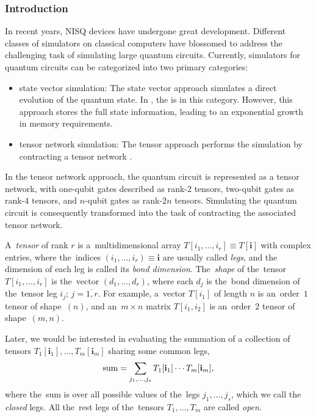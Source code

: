 \subsubsection{Introduction}
In recent years, NISQ devices have undergone great development. Different classes of simulators on classical computers have blossomed to address the challenging task of simulating large quantum circuits. Currently, simulators for quantum circuits can be categorized into two primary categories:
\begin{itemize}
    \item state vector simulation: The state vector approach simulates a direct evolution of the quantum state. In \MindQuantum, the  is in this category. However, this approach stores the full state information, leading to an exponential growth in memory requirements.
    \item tensor network simulation: The tensor approach performs the simulation by contracting a tensor network \cite{Huggins_2019,PhysRevLett.128.030501}.
\end{itemize}

In the tensor network approach, the quantum circuit is represented as a tensor network, with one-qubit gates described as rank-2 tensors, two-qubit gates as rank-4 tensors, and $n$-qubit gates as rank-2$n$ tensors. Simulating the quantum circuit is consequently transformed into the task of contracting the associated tensor network.

A~\emph{tensor} of rank $r$ is a~multidimensional array $T[i_1,\dots,i_r] \equiv T[\mathbf{i}]$ with complex entries, where the~indices $(i_1,\dots,i_r) \equiv \mathbf{i}$ are usually called \emph{legs}, and the dimension of each leg is called its \emph{bond dimension}. The~\emph{shape} of the~tensor $T[i_1,\dots,i_r]$ is the~vector $(d_1,\dots,d_r)$, where each $d_j$ is the~bond dimension of the~tensor leg $i_j$;  $j=\overline{1,r}$. For example, a~vector $T[i_1]$ of length $n$ is an~order~$1$ tensor of shape~$(n)$, and an~$m\times n$ matrix $T[i_1,i_2]$ is an~order~$2$ tensor of shape~$(m, n)$.

Later, we would be interested in evaluating the summation of a collection of tensors $T_1[\mathbf{i}_1],\dots, T_m[\mathbf{i}_m]$ sharing some common legs,
\begin{equation}\label{eq:sum}
    {\rm{sum}}=\sum_{j_1,\dots,j_s} T_1[\mathbf{i}_1]\cdots T_m[\mathbf{i}_m],
\end{equation}
where the~sum is over all possible values of the~legs $j_1,\dots,j_s$, which we call the \emph{closed} legs. All the~rest legs of the~tensors $T_1,\dots,T_m$ are called \emph{open}.

